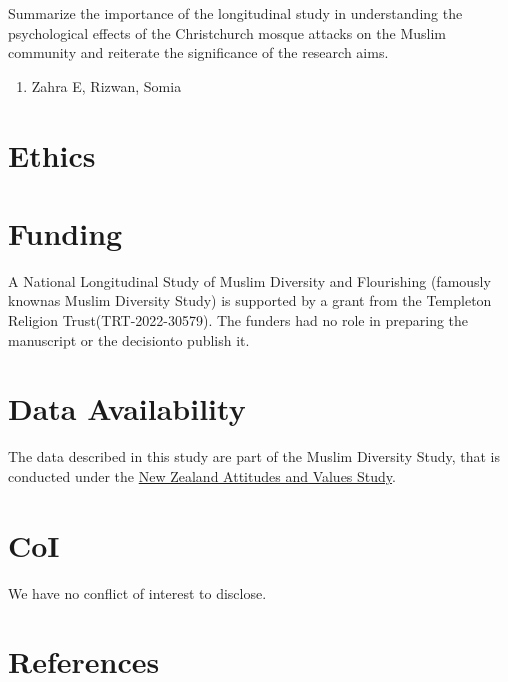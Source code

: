 \documentclass[
  man,
  longtable,
  nolmodern,
  notxfonts,
  notimes,
  colorlinks=true,linkcolor=blue,citecolor=blue,urlcolor=blue]{apa7}
\providecommand{\tightlist}{%
  \setlength{\itemsep}{0pt}\setlength{\parskip}{0pt}}
\begin{document}
Summarize the importance of the longitudinal study in understanding the
psychological effects of the Christchurch mosque attacks on the Muslim
community and reiterate the significance of the research aims.

\begin{enumerate}
\def\labelenumi{\arabic{enumi}.}
\tightlist
\item
  Zahra E, Rizwan, Somia
\end{enumerate}

\section{Ethics}\label{ethics}

\section{Funding}\label{funding}

A National Longitudinal Study of Muslim Diversity and Flourishing
(famously knownas Muslim Diversity Study) is supported by a grant from
the Templeton Religion Trust(TRT-2022-30579). The funders had no role in
preparing the manuscript or the decisionto publish it.

\section{Data Availability}\label{data-availability}

The data described in this study are part of the Muslim Diversity Study,
that is conducted under the \href{https://osf.io/75snb/}{New Zealand
Attitudes and Values Study}.

\section{CoI}\label{coi}

We have no conflict of interest to disclose.

\newpage{}

\section{References}\label{references}
\end{document}
